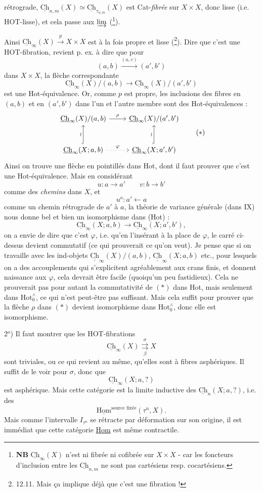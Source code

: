 \documentclass[11pt]{article}
\newcommand{\printedpage}[1]{\marginpar{\footnotesize p.~#1}}
\newcommand{\msp}[1]{\marginpar{\footnotesize [#1]}}
\newcommand{\Ch}{\underline{\mathrm{Ch}}}
\newcommand{\CCh}{\underline{\underline{\mathrm{Ch}}}}
\newcommand{\Hotz}{\mathrm{Hot}^{\wedge}_{0}}
\begin{document}
\printedpage{94}
rétrograde, $\Ch_{n,m}(X) \simeq \Ch_{\tau_{n,m}}(X)$ est Cat-\textit{fibrée} sur $X \times X$, donc lisse (i.e. HOT-lisse), et cela passe aux $\varinjlim$ (\footnote[36]{\textbf{NB} $\Ch_\infty(X)$ n'est ni fibrée ni cofibrée sur $X \times X$ - car les foncteurs d'inclusion entre les $\Ch_{n,m}$ ne sont pas cartésiens resp. cocartésiens.}).

Ainsi $\Ch_\infty(X) \xrightarrow{p} X \times X$ est à la fois propre et lisse (\footnote[37]{12.11. Mais ça implique déjà que c'est une fibration !}). Dire que c'est une HOT-fibration, revient p. ex. à dire que pour
\[
(a,b) \xrightarrow{(u,v)} (a',b')
\]
dans $X \times X$, la flèche correspondante
\[
\Ch_\infty(X)/(a,b) \longrightarrow \Ch_\infty(X)/(a',b')
\]
est une Hot-équivalence. Or, comme $p$ est propre, les inclusions des fibres en $(a,b)$ et en $(a',b')$ dans l'un et l'autre membre sont des Hot-équivalences :
\msp{page 151}
\[
\begin{tikzcd}[row sep=large]
\Ch_\infty(X)/(a,b) \arrow[r, "\rho"] & \Ch_\infty(X)/(a',b') \\
\Ch_\infty(X;a,b) \arrow[u, hook, "\wr"] \arrow[r, dotted, "\varphi"] & \Ch_\infty(X;a',b') \arrow[u, hook, "\wr"]
\end{tikzcd}
\tag*{$(*)$}
\]
Ainsi on trouve une flèche en pointillés dans Hot, dont il faut prouver que c'est une Hot-équivalence. Mais en considérant
\[
u : a \longrightarrow a' \qquad v : b \longrightarrow b'
\]
comme des \textit{chemins} dans $X$, et
\[
u^o : a' \longleftarrow a
\]
comme un chemin rétrograde de $a'$ à $a$, la théorie de variance générale (dans IX) nous donne bel et bien un isomorphisme dans (Hot) :
\[
\Ch_\infty(X;a,b) \longrightarrow \Ch_\infty(X;a',b'),
\]
on a envie de dire que c'est $\varphi$, i.e. qu'en l'insérant à la place de $\varphi$, le carré ci-dessus devient commutatif (ce qui prouverait ce qu'on veut). Je pense que si on travaille avec les ind-objets $\CCh_\infty(X)/(a,b)$, $\CCh_\infty(X;a,b)$ etc., pour lesquels on a des accouplements qui s'explicitent agréablement aux crans finis, et donnent naissance aux $\varphi$, cela devrait être facile (quoiqu'un peu fastidieux). Cela ne prouverait pas pour autant la commutativité de $(*)$ dans Hot, mais
\printedpage{95}
\msp{page 152}
seulement dans $\Hotz$, ce qui n'est peut-être pas suffisant. Mais cela suffit pour prouver que la flèche $\rho$ dans $(*)$ devient isomorphisme dans $\Hotz$, donc elle est isomorphisme.

2$^o$) Il faut montrer que les HOT-fibrations
\[
\Ch_\infty(X) \overset{\sigma}{\underset{\beta}{\rightrightarrows}} X
\]
sont triviales, ou ce qui revient au même, qu'elles sont à fibres asphériques. Il suffit de le voir pour $\sigma$, donc que
\[
\Ch_\infty(X;a,?)
\]
est asphérique. Mais cette catégorie est la limite inductive des $\Ch_n(X;a,?)$, i.e. des
\[
\underline{\mathrm{Hom}}^{\text{source fixée}}(\tau^n, X).
\]
Mais comme l'intervalle $I_{\tau^n}$ se rétracte par déformation sur son origine, il est immédiat que cette catégorie \underline{Hom} est même contractile.
\end{document}
